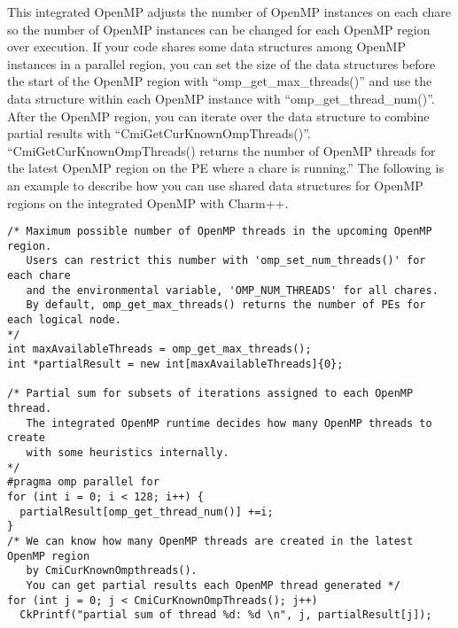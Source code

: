 This integrated OpenMP adjusts the number of OpenMP instances on each chare so the number of 
OpenMP instances can be changed for each OpenMP region over execution.
If your code shares some data structures among OpenMP instances in a parallel region, you can set the size of 
the data structures before the start of the OpenMP region with ``omp\_get\_max\_threads()'' 
and use the data structure within each OpenMP instance with ``omp\_get\_thread\_num()''. 
After the OpenMP region, you can iterate over the data structure to combine partial results 
with ``CmiGetCurKnownOmpThreads()''. ``CmiGetCurKnownOmpThreads() returns the number of OpenMP 
threads for the latest OpenMP region on the PE where a chare is running.'' The following is an
example to describe how you can use shared data structures for OpenMP regions on the integrated 
OpenMP with Charm++.
\begin{verbatim}
/* Maximum possible number of OpenMP threads in the upcoming OpenMP region.
   Users can restrict this number with 'omp_set_num_threads()' for each chare 
   and the environmental variable, 'OMP_NUM_THREADS' for all chares.
   By default, omp_get_max_threads() returns the number of PEs for each logical node.
*/
int maxAvailableThreads = omp_get_max_threads();
int *partialResult = new int[maxAvailableThreads]{0};

/* Partial sum for subsets of iterations assigned to each OpenMP thread.
   The integrated OpenMP runtime decides how many OpenMP threads to create 
   with some heuristics internally.
*/
#pragma omp parallel for
for (int i = 0; i < 128; i++) {
  partialResult[omp_get_thread_num()] +=i;
}
/* We can know how many OpenMP threads are created in the latest OpenMP region
   by CmiCurKnownOmpthreads().
   You can get partial results each OpenMP thread generated */
for (int j = 0; j < CmiCurKnownOmpThreads(); j++)
  CkPrintf("partial sum of thread %d: %d \n", j, partialResult[j]);
\end{verbatim}


